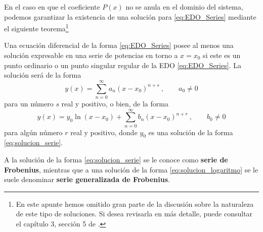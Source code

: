 En el caso en que el coeficiente $P(x)$ no se anula en el dominio del sistema, podemos garantizar la existencia de una solución para \eqref{eq:EDO_Series} mediante el siguiente teorema\footnote{En este apunte hemos omitido gran parte de la discusión sobre la naturaleza de este tipo de soluciones. Si desea revisarla en más detalle, puede consultar el capítulo 3, sección 5 de \cite{Butkov}.}
\begin{teorema}[de Fuchs]\label{teo:Fuchs}
    Una ecuación diferencial de la forma \eqref{eq:EDO_Series} posee al menos una solución expresable en una serie de potencias en torno a $x=x_0$ si este es un punto ordinario o un punto singular regular de la EDO \eqref{eq:EDO_Series}. La solución será de la forma 
    \begin{equation} \label{eq:solucion_serie}
        y(x) = \sum_{n=0}^\infty a_n(x-x_0)^{n+s} \ , \qquad a_0 \neq 0
    \end{equation}
    para un número $s$ real y positivo, o bien, de la forma 
    \begin{equation}\label{eq:solucion_logaritmo}
        y(x) = y_0 \ln(x-x_0) + \sum_{n=0}^\infty b_n (x-x_0)^{n+r} \ , \qquad b_0 \neq 0 
    \end{equation}
    para algún número $r$ real y positivo, donde $y_0$ es una solución de la forma \eqref{eq:solucion_serie}.

    A la solución de la forma \eqref{eq:solucion_serie} se le conoce como \textbf{serie de Frobenius}, mientras que a una solución de la forma \eqref{eq:solucion_logaritmo} se le suele denominar \textbf{serie generalizada de Frobenius}.
\end{teorema}

